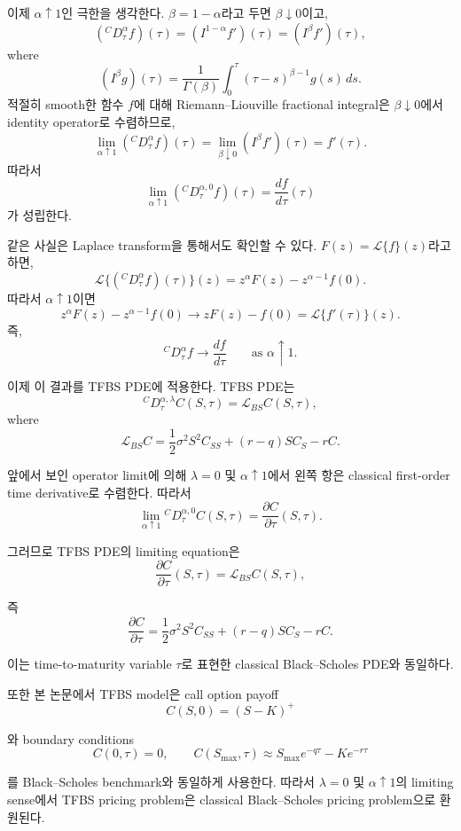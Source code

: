 \documentclass[11pt,a4paper]{report}
\begin{document}
이제 \(\alpha \uparrow 1\)인 극한을 생각한다. \(\beta=1-\alpha\)라고 두면 \(\beta\downarrow0\)이고,
\[
({}^C D_\tau^\alpha f)(\tau)
=
(I^{1-\alpha}f')(\tau)
=
(I^\beta f')(\tau),
\]
where
\[
(I^\beta g)(\tau)
=
\frac{1}{\Gamma(\beta)}
\int_0^\tau
(\tau-s)^{\beta-1}g(s)\,ds.
\]
적절히 smooth한 함수 \(f\)에 대해 Riemann--Liouville fractional integral은 \(\beta\downarrow0\)에서 identity operator로 수렴하므로,
\[
\lim_{\alpha\uparrow1}
({}^C D_\tau^\alpha f)(\tau)
=
\lim_{\beta\downarrow0}
(I^\beta f')(\tau)
=
f'(\tau).
\]
따라서
\[
\boxed{
\lim_{\alpha\uparrow1}
({}^C D_\tau^{\alpha,0} f)(\tau)
=
\frac{df}{d\tau}(\tau)
}
\]
가 성립한다.

같은 사실은 Laplace transform을 통해서도 확인할 수 있다. \(F(z)=\mathcal{L}\{f\}(z)\)라고 하면,
\[
\mathcal{L}\{({}^C D_\tau^\alpha f)(\tau)\}(z)
=
z^\alpha F(z)-z^{\alpha-1}f(0).
\]
따라서 \(\alpha\uparrow1\)이면
\[
z^\alpha F(z)-z^{\alpha-1}f(0)
\longrightarrow
zF(z)-f(0)
=
\mathcal{L}\{f'(\tau)\}(z).
\]
즉,
\[
{}^C D_\tau^\alpha f
\longrightarrow
\frac{df}{d\tau}
\qquad
\text{as } \alpha\uparrow1.
\]

이제 이 결과를 TFBS PDE에 적용한다. TFBS PDE는
\[
{}^C D_\tau^{\alpha,\lambda} C(S,\tau)
=
\mathcal{L}_{BS}C(S,\tau),
\]
where
\[
\mathcal{L}_{BS}C
=
\frac{1}{2}\sigma^2S^2C_{SS}
+
(r-q)SC_S
-
rC.
\]

앞에서 보인 operator limit에 의해 \(\lambda=0\) 및 \(\alpha\uparrow1\)에서 왼쪽 항은 classical first-order time derivative로 수렴한다. 따라서
\[
\lim_{\alpha\uparrow1}
{}^C D_\tau^{\alpha,0} C(S,\tau)
=
\frac{\partial C}{\partial \tau}(S,\tau).
\]

그러므로 TFBS PDE의 limiting equation은
\[
\frac{\partial C}{\partial \tau}(S,\tau)
=
\mathcal{L}_{BS}C(S,\tau),
\]

즉
\[
\frac{\partial C}{\partial \tau}
=
\frac{1}{2}\sigma^2S^2C_{SS}
+
(r-q)SC_S
-
rC.
\]

이는 time-to-maturity variable \(\tau\)로 표현한 classical Black--Scholes PDE와 동일하다.

또한 본 논문에서 TFBS model은 call option payoff
\[
C(S,0)=(S-K)^+
\]

와 boundary conditions
\[
C(0,\tau)=0,
\qquad
C(S_{\max},\tau)
\approx
S_{\max}e^{-q\tau}-Ke^{-r\tau}
\]

를 Black--Scholes benchmark와 동일하게 사용한다. 따라서 \(\lambda=0\) 및 \(\alpha\uparrow1\)의 limiting sense에서 TFBS pricing problem은 classical Black--Scholes pricing problem으로 환원된다.
\end{document}
